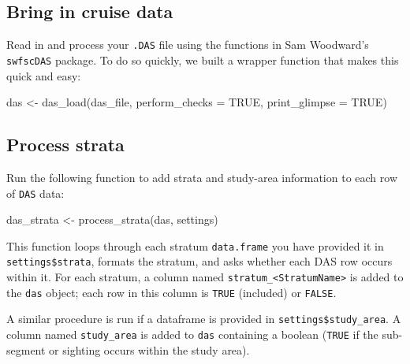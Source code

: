 \documentclass[
]{book}
\newenvironment{Shaded}{\begin{snugshade}}{\end{snugshade}}
\newcommand{\AttributeTok}[1]{\textcolor[rgb]{0.77,0.63,0.00}{#1}}
\newcommand{\ConstantTok}[1]{\textcolor[rgb]{0.00,0.00,0.00}{#1}}
\newcommand{\FunctionTok}[1]{\textcolor[rgb]{0.00,0.00,0.00}{#1}}
\newcommand{\NormalTok}[1]{#1}
\newcommand{\OtherTok}[1]{\textcolor[rgb]{0.56,0.35,0.01}{#1}}
\begin{document}
\hypertarget{bring-in-cruise-data}{%
\subsection*{Bring in cruise data}\label{bring-in-cruise-data}}

Read in and process your \texttt{.DAS} file using the functions in Sam Woodward's \texttt{swfscDAS} package. To do so quickly, we built a wrapper function that makes this quick and easy:

\begin{Shaded}
\begin{Highlighting}[]
\NormalTok{das }\OtherTok{\textless{}{-}} \FunctionTok{das\_load}\NormalTok{(das\_file, }
                \AttributeTok{perform\_checks =} \ConstantTok{TRUE}\NormalTok{,}
                \AttributeTok{print\_glimpse =} \ConstantTok{TRUE}\NormalTok{)}
\end{Highlighting}
\end{Shaded}

\hypertarget{process-strata}{%
\subsection*{Process strata}\label{process-strata}}

Run the following function to add strata and study-area information to each row of \texttt{DAS} data:

\begin{Shaded}
\begin{Highlighting}[]
\NormalTok{das\_strata }\OtherTok{\textless{}{-}} \FunctionTok{process\_strata}\NormalTok{(das, settings)}
\end{Highlighting}
\end{Shaded}

This function loops through each stratum \texttt{data.frame} you have provided it in \texttt{settings\$strata}, formats the stratum, and asks whether each DAS row occurs within it. For each stratum, a column named \texttt{stratum\_\textless{}StratumName\textgreater{}} is added to the \texttt{das} object; each row in this column is \texttt{TRUE} (included) or \texttt{FALSE}.

A similar procedure is run if a dataframe is provided in \texttt{settings\$study\_area}. A column named \texttt{study\_area} is added to \texttt{das} containing a boolean (\texttt{TRUE} if the sub-segment or sighting occurs within the study area).
\end{document}
